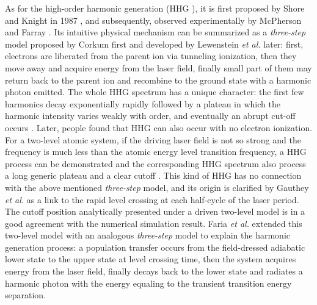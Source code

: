 \documentclass[10pt,letterpaper]{article}
\begin{document}
As for the high-order harmonic generation (HHG ), it is first proposed by Shore and Knight in 1987 \cite{Shore-HHG-Origin-JPB-1987}, and subsequently, observed experimentally by McPherson \cite{McPherson-Early-HHG-JOSAB-1987} and Farray \cite{Ferray-Early-HHG-JPB-1988}. Its intuitive physical mechanism can be summarized as a \emph{three-step} model proposed by Corkum first \cite{Corkum-PRL-1993} and developed by Lewenstein \emph{et al.} later\cite{Lewenstein-SFA-PRA-1994}: first, electrons are liberated from the parent ion via tunneling ionization, then they move away and acquire energy from the laser field, finally small part of them may return back to the parent ion and recombine to the ground state with a harmonic photon emitted. The whole HHG spectrum has a unique character: the first few harmonics decay exponentially rapidly followed by a plateau in which the harmonic intensity varies weakly with order, and eventually an abrupt cut-off occurs \cite{1997Review}. Later, people found that HHG can also occur with no electron ionization. For a two-level atomic system, if the driving laser field is not so strong and the frequency is much less than the atomic energy level transition frequency, a HHG process can be demonstrated and the corresponding HHG spectrum also process a long generic plateau and a clear cutoff \cite{Sundaram-Early-Two-Level-PRA-1990,Ivanov-Early-Two-Level-PRA-1993,Kaplan-Early-Two-Level-PRA-1994,Gauthey-Early-Two-Level-PRA-1997}. This kind of HHG has no connection with the above mentioned \emph{three-step} model, and its origin is clarified by Gauthey \emph{et al.} \cite{Gauthey-Early-Two-Level-PRA-1997} as a link to the rapid level crossing at each half-cycle of the laser period. The cutoff position analytically presented under a driven two-level model is in a good agreement with the numerical simulation result. Faria \emph{et al.} \cite{Faria-Two-Level-Three-Step-PRA-2002} extended this two-level model with an analogous \emph{three-step} model to explain the harmonic generation process: a population transfer occurs from the field-dressed adiabatic lower state to the upper state at level crossing time, then the system acquires energy from the laser field, finally decays back to the lower state and radiates a harmonic photon with the energy equaling to the transient transition energy separation.
\end{document}
